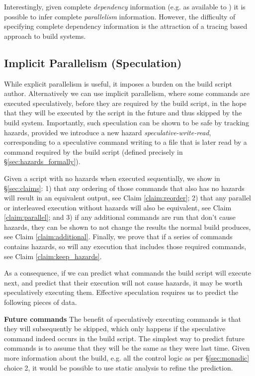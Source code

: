 Interestingly, given complete \emph{dependency} information (e.g. as available to \Make) it is possible to infer complete \emph{parallelism} information. However, the difficulty of specifying complete dependency information is the attraction of a tracing based approach to build systems.

\subsection{Implicit Parallelism (Speculation)}
\label{sec:speculation}

While explicit parallelism is useful, it imposes a burden on the build script author. Alternatively we can use implicit parallelism, where some commands are executed speculatively, before they are required by the build script, in the hope that they will be executed by the script in the future and thus skipped by the build system. Importantly, such speculation can be shown to be safe by tracking hazards, provided we introduce a new hazard \emph{speculative-write-read}, corresponding to a speculative command writing to a file that is later read by a command required by the build script (defined precisely in \S\ref{sec:hazards_formally}).

Given a script with no hazards when executed sequentially, we show in \S\ref{sec:claims}: 1) that any ordering of those commands that also has no hazards will result in an equivalent output, see Claim \ref{claim:reorder}; 2) that any parallel or interleaved execution without hazards will also be equivalent, see Claim \ref{claim:parallel}; and 3) if any additional commands are run that don't cause hazards, they can be shown to not change the results the normal build produces, see Claim \ref{claim:additional}. Finally, we prove that if a series of commands contains hazards, so will any execution that includes those required commands, see Claim \ref{claim:keep_hazards}.

As a consequence, if we can predict what commands the build script will execute next, and predict that their execution will not cause hazards, it may be worth speculatively executing them. Effective speculation requires us to predict the following pieces of data.

\textbf{Future commands} The benefit of speculatively executing commands is that they will subsequently be skipped, which only happens if the speculative command indeed occurs in the build script. The simplest way to predict future commands is to assume that they will be the same as they were last time. Given more information about the build, e.g. all the control logic as per \S\ref{sec:monadic} choice 2, it would be possible to use static analysis to refine the prediction.

